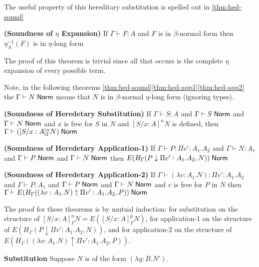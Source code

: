 The useful property of this hereditary substitution is spelled out in \ref{thm:hed-sound}

\begin{theorem}
\textbf{(Soundness of $\eta$ Expansion)}
If  $\Gamma \vdash F : A$ 
and $F$ is in $\beta$-normal form then
$\eta^{-1}_{A}(F)$ is in $\eta$-long form
\label{thm:hed-long}
\end{theorem}

The proof of this theorem is trivial since all that occurs is the complete $\eta$ expansion 
of every possible term. 

Note, in the following theorems \ref{thm:hed-sound}\ref{thm:hed-app1}\ref{thm:hed-app2} the $\Gamma \vdash N \; \mathsf{Norm}$ means that $N $ is in $\beta$-normal 
$\eta$-long form (ignoring types).

\begin{theorem}
\textbf{(Soundness of Heredetary Substitution)}
If  $\Gamma \vdash S : A$ 
and $\Gamma \vdash S \; \mathsf{Norm}$ 
and $\Gamma \vdash N \; \mathsf{Norm}$ 
and $x$ is free for $S$ in $N$
and $[S / x : A]^n N$ is defined, 
then $\Gamma \vdash ([S / x : A]_\Gamma^n N) \; \mathsf{Norm}$ 
\label{thm:hed-sound}
\end{theorem}
\begin{theorem}
\textbf{(Soundness of Heredetary Application-1)}
If  $\Gamma \vdash P : \Pi v' : A_1 . A_2$ 
and $\Gamma \vdash N : A_1$ 
and $\Gamma \vdash P \; \mathsf{Norm}$ 
and $\Gamma \vdash N \; \mathsf{Norm}$ 
then $E(H_\Gamma(P \downarrow \Pi v' : A_1 . A_2 , N)) \; \mathsf{Norm}$ 
\label{thm:hed-app1}
\end{theorem}
\begin{theorem}
\textbf{(Soundness of Heredetary Application-2)}
If  $\Gamma \vdash (\lambda v : A_1 . N) : \Pi v' : A_1 . A_2$ 
and $\Gamma \vdash P : A_1$ 
and $\Gamma \vdash P \; \mathsf{Norm}$ 
and $\Gamma \vdash N \; \mathsf{Norm}$ 
and $v$ is free for $P$ in $N$
then $\Gamma \vdash E(H_\Gamma((\lambda v : A_1 . N) \uparrow \Pi v' : A_1 . A_2 , P)) \; \mathsf{Norm}$ 
\label{thm:hed-app2}
\end{theorem}

The proof for these theorems is by mutual induction:  
for substitution on the structure of $[S/x : A]_\Gamma^n N = E([S/x : A]_\Gamma^p N)$, 
for application-1 on the structure of $E(H_\Gamma(P \downarrow \Pi v' : A_1 . A_2 , N))$,
and for application-2 on the structure of $E(H_\Gamma((\lambda v : A_1 . N) \uparrow \Pi v' : A_1 . A_2 , P))$.

\setcounter{tcases}{0}
\begin{tcases}
\textbf{Substitution} Suppose $N$ is of the form $(\lambda y : B . N')$.
\end{tcases}

